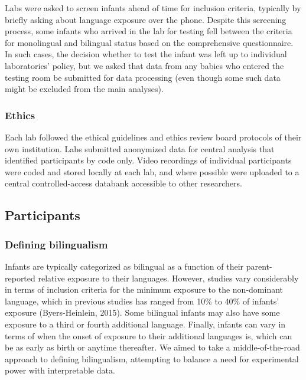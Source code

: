 \documentclass[,man,floatsintext]{apa6}
\begin{document}
Labs were asked to screen infants ahead of time for inclusion criteria, typically by briefly asking about language exposure over the phone. Despite this screening process, some infants who arrived in the lab for testing fell between the criteria for monolingual and bilingual status based on the comprehensive questionnaire. In such cases, the decision whether to test the infant was left up to individual laboratories' policy, but we asked that data from any babies who entered the testing room be submitted for data processing (even though some such data might be excluded from the main analyses).

\hypertarget{ethics}{%
\subsubsection{Ethics}\label{ethics}}

Each lab followed the ethical guidelines and ethics review board protocols of their own institution. Labs submitted anonymized data for central analysis that identified participants by code only. Video recordings of individual participants were coded and stored locally at each lab, and where possible were uploaded to a central controlled-access databank accessible to other researchers.

\hypertarget{participants}{%
\subsection{Participants}\label{participants}}

\hypertarget{defining-bilingualism}{%
\subsubsection{Defining bilingualism}\label{defining-bilingualism}}

Infants are typically categorized as bilingual as a function of their parent-reported relative exposure to their languages. However, studies vary considerably in terms of inclusion criteria for the minimum exposure to the non-dominant language, which in previous studies has ranged from 10\% to 40\% of infants' exposure (Byers-Heinlein, 2015). Some bilingual infants may also have some exposure to a third or fourth additional language. Finally, infants can vary in terms of when the onset of exposure to their additional languages is, which can be as early as birth or anytime thereafter. We aimed to take a middle-of-the-road approach to defining bilingualism, attempting to balance a need for experimental power with interpretable data.
\end{document}
